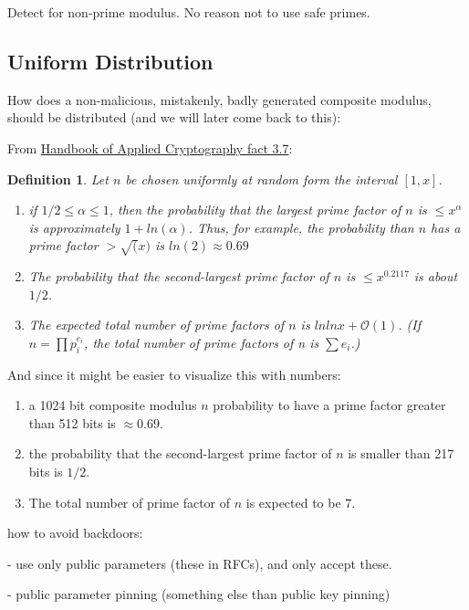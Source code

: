 \documentclass[a4paper,11pt,twocolumn]{article}
\newtheorem{definition}{Definition}
\begin{document}
Detect for non-prime modulus. No reason not to use safe primes.

\subsection{Uniform Distribution}

How does a non-malicious, mistakenly, badly generated composite modulus, should be distributed (and we will later come back to this):

From \href{http://cacr.uwaterloo.ca/hac/about/chap3.pdf}{Handbook of Applied Cryptography fact 3.7}:

\begin{definition}
    Let $n$ be chosen uniformly at random form the interval $[1, x]$.
    \begin{enumerate}
        \item if $1/2 \leq \alpha \leq 1$, then the probability that the largest prime factor of $n$ is $\leq x^{\alpha}$ is approximately $1+ ln(\alpha)$. Thus, for example, the probability than $n$ has a prime factor $> \sqrt(x)$ is $ln(2) \approx 0.69$
        \item The probability that the second-largest prime factor of $n$ is $\leq x^{0.2117}$ is about $1/2$. 
        \item The expected total number of prime factors of $n$ is $ln ln x + \mathcal{O}(1)$. (If $n = \prod p_i^{e_i}$, the total number of prime factors of n is $\sum e_i$.)
    \end{enumerate} 
\end{definition}

And since it might be easier to visualize this with numbers:

\begin{enumerate}
    \item a 1024 bit composite modulus $n$ probability to have a prime factor greater than 512 bits is $\approx 0.69$.
    \item the probability that the second-largest prime factor of $n$ is smaller than 217 bits is $1/2$.
    \item The total number of prime factor of $n$ is expected to be $7$.
\end{enumerate}

how to avoid backdoors:

- use only public parameters (these in RFCs), and only accept these. 

- public parameter pinning (something else than public key pinning)
\end{document}
